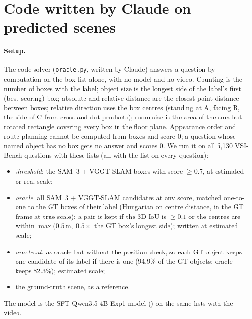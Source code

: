 \section{Code written by Claude on predicted scenes}
\label{sec:agent-code}

\paragraph{Setup.}
The code solver (\texttt{oracle.py}, written by Claude) answers a question by computation on the box list alone, with no
model and no video. Counting is the number of boxes with the label; object size is the longest side of the label's first
(best-scoring) box; absolute and relative distance are the closest-point distance between boxes; relative direction uses
the box centres (standing at A, facing B, the side of C from cross and dot products); room size is the area of the
smallest rotated rectangle covering every box in the floor plane. Appearance order and route planning cannot be computed
from boxes and score 0; a question whose named object has no box gets no answer and scores 0. We run it on all 5,130
VSI-Bench questions with these lists (all with the list on every question):
\begin{itemize}
\item \emph{threshold}: the SAM~3 + VGGT-SLAM boxes with score $\geq 0.7$, at estimated or real scale;
\item \emph{oracle}: all SAM~3 + VGGT-SLAM candidates at any score, matched one-to-one to the GT boxes of their label
  (Hungarian on centre distance, in the GT frame at true scale); a pair is kept if the 3D IoU is $\geq 0.1$ or the centres
  are within $\max(0.5\,\mathrm{m},\ 0.5\times$ the GT box's longest side); written at estimated scale;
\item \emph{oraclecnt}: as oracle but without the position check, so each GT object keeps one candidate of its label if
  there is one (94.9\% of the GT objects; oracle keeps 82.3\%); estimated scale;
\item the ground-truth scene, as a reference.
\end{itemize}
The model is the SFT Qwen3.5-4B Exp1 model () on
the same lists with the video.

